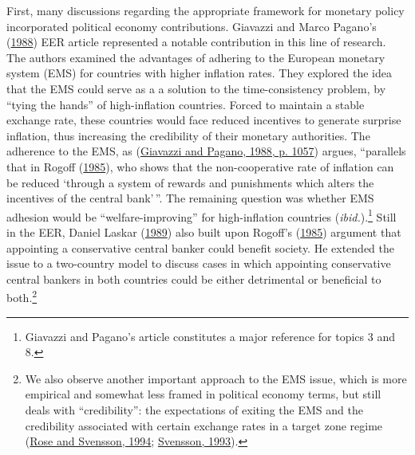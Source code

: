 \documentclass[
  12pt,
  onecolumn]{article}
\begin{document}
First, many discussions regarding the appropriate framework for monetary policy incorporated political economy contributions. Giavazzi and Marco Pagano's (\protect\hyperlink{ref-giavazzi1988}{1988}) EER article represented a notable contribution in this line of research. The authors examined the advantages of adhering to the European monetary system (EMS) for countries with higher inflation rates. They explored the idea that the EMS could serve as a a solution to the time-consistency problem, by ``tying the hands'' of high-inflation countries. Forced to maintain a stable exchange rate, these countries would face reduced incentives to generate surprise inflation, thus increasing the credibility of their monetary authorities. The adherence to the EMS, as (\protect\hyperlink{ref-giavazzi1988}{Giavazzi and Pagano, 1988, p. 1057}) argues, ``parallels that in Rogoff (\protect\hyperlink{ref-rogoff1985b}{1985}), who shows that the non-cooperative rate of inflation can be reduced `through a system of rewards and punishments which alters the incentives of the central bank'\,''. The remaining question was whether EMS adhesion would be ``welfare-improving'' for high-inflation countries (\emph{ibid.}).\footnote{Giavazzi and Pagano's article constitutes a major reference for topics 3 and 8.} Still in the EER, Daniel Laskar (\protect\hyperlink{ref-laskar1989}{1989}) also built upon Rogoff's (\protect\hyperlink{ref-rogoff1985b}{1985}) argument that appointing a conservative central banker could benefit society. He extended the issue to a two-country model to discuss cases in which appointing conservative central bankers in both countries could be either detrimental or beneficial to both.\footnote{We also observe another important approach to the EMS issue, which is more empirical and somewhat less framed in political economy terms, but still deals with ``credibility'': the expectations of exiting the EMS and the credibility associated with certain exchange rates in a target zone regime (\protect\hyperlink{ref-rose1994}{Rose and Svensson, 1994}; \protect\hyperlink{ref-svensson1993a}{Svensson, 1993}).}
\end{document}
